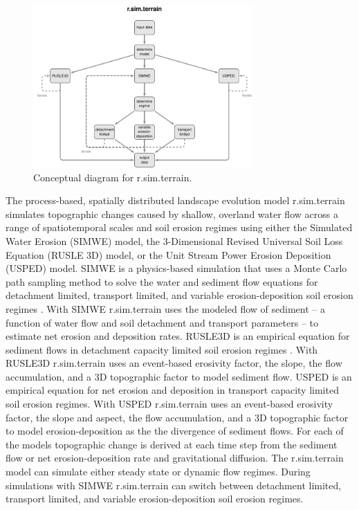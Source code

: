 \documentclass[gmd, manuscript]{copernicus}
\begin{document}

\begin{figure}%
\center
\includegraphics[width=0.75\textwidth,keepaspectratio]{figures/concept.pdf}
\caption{Conceptual diagram for r.sim.terrain.}
\label{fig:evolution}
\end{figure}


The process-based, spatially distributed 
landscape evolution model r.sim.terrain
simulates topographic changes
caused by shallow, overland water flow
across a range of spatiotemporal scales and soil erosion regimes
using either
the Simulated Water Erosion (SIMWE) model, 
the 3-Dimensional Revised Universal Soil Loss Equation (RUSLE 3D) model,
or the Unit Stream Power Erosion Deposition (USPED) model.  
SIMWE is a physics-based simulation
that uses a Monte Carlo path sampling method
to solve the water and sediment flow equations 
for detachment limited, transport limited, and variable erosion-deposition 
soil erosion regimes \citep{Mitasova2004}. 
With SIMWE 
r.sim.terrain
uses the modeled flow of sediment 
-- a function of water flow and soil detachment and transport parameters -- 
to estimate net erosion and deposition rates. 
RUSLE3D is an empirical equation for sediment flows 
in detachment capacity limited soil erosion regimes \citep{Mitasova1996}. 
With RUSLE3D
r.sim.terrain
uses an event-based erosivity factor, 
the slope, the flow accumulation, and a 3D topographic factor
to model sediment flow. 
USPED is an empirical equation for net erosion and deposition 
in transport capacity limited soil erosion regimes. 
With USPED 
r.sim.terrain
uses an event-based erosivity factor, 
the slope and aspect, the flow accumulation, and a 3D topographic factor
to model erosion-deposition as the
the divergence of sediment flows. 
For each of the models 
topographic change is derived at each time step
from the sediment flow or net erosion-deposition rate
and gravitational diffusion.
The r.sim.terrain model
can simulate either steady state or dynamic flow regimes.
During simulations with SIMWE 
r.sim.terrain
can switch between 
detachment limited, transport limited, and variable erosion-deposition 
soil erosion regimes.
\end{document}
